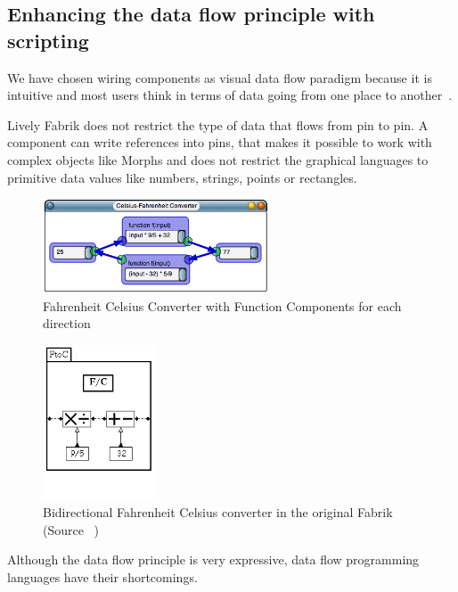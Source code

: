 \documentclass[pdftex, times, 10pt, twocolumn]{article}
\begin{document}
\subsection{Enhancing the data flow principle with scripting}
We have chosen wiring components as visual data flow paradigm because it is intuitive and most users think in terms of data going from one place to another~\cite{Baroth1995VPR,Johnston2004ADP}. 

Lively Fabrik does not restrict the type of data that flows from pin to pin. A component can write references into pins, that makes it possible to work with complex objects like Morphs and does not restrict the graphical languages to primitive data values like numbers, strings, points or rectangles.  



\begin{figure}[]\centering
\includegraphics[width=0.600000\textwidth]{FabrikCelsiusFahrenheit.png} 

\caption{Fahrenheit Celsius Converter with Function Components for each direction }
\label{fig:FabrikCelsiusFahrenheit}
\end{figure}


\begin{figure}[]\centering
\includegraphics[width=0.300000\textwidth]{Fabrik_figure2b.png} 

\caption{Bidirectional Fahrenheit Celsius converter in the original Fabrik (Source ~\cite{Ingalls1988FVP}) }
\label{fig:FabrikCelsiusFahrenheitOriginal}
\end{figure}
Although the data flow principle is very expressive, data flow programming languages have their shortcomings. 
\end{document}
